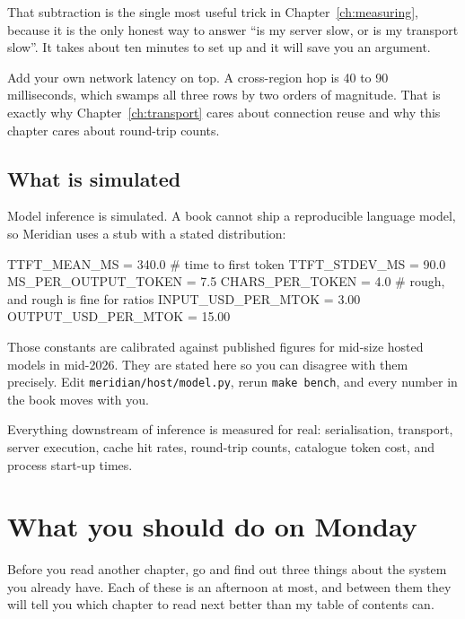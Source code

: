 That subtraction is the single most useful trick in Chapter~\ref{ch:measuring},
because it is the only honest way to answer ``is my server slow, or is my
transport slow''. It takes about ten minutes to set up and it will save you an
argument.

Add your own network latency on top. A cross-region hop is 40 to 90
milliseconds, which swamps all three rows by two orders of magnitude. That is
exactly why Chapter~\ref{ch:transport} cares about connection reuse and why this
chapter cares about round-trip counts.

\subsection{What is simulated}
\label{sec:simulated}

Model inference is simulated. A book cannot ship a reproducible language model,
so Meridian uses a stub with a stated distribution:

\begin{py}
TTFT_MEAN_MS         = 340.0   # time to first token
TTFT_STDEV_MS        = 90.0
MS_PER_OUTPUT_TOKEN  = 7.5
CHARS_PER_TOKEN      = 4.0     # rough, and rough is fine for ratios
INPUT_USD_PER_MTOK   = 3.00
OUTPUT_USD_PER_MTOK  = 15.00
\end{py}

Those constants are calibrated against published figures for mid-size hosted
models in mid-2026. They are stated here so you can disagree with them precisely. Edit \texttt{meridian/host/model.py}, rerun
\texttt{make bench}, and every number in the book moves with you.

Everything downstream of inference is measured for real: serialisation,
transport, server execution, cache hit rates, round-trip counts, catalogue token
cost, and process start-up times.


\section{What you should do on Monday}

Before you read another chapter, go and find out three things about the system
you already have. Each of these is an afternoon at most, and between them they
will tell you which chapter to read next better than my table of contents can.

